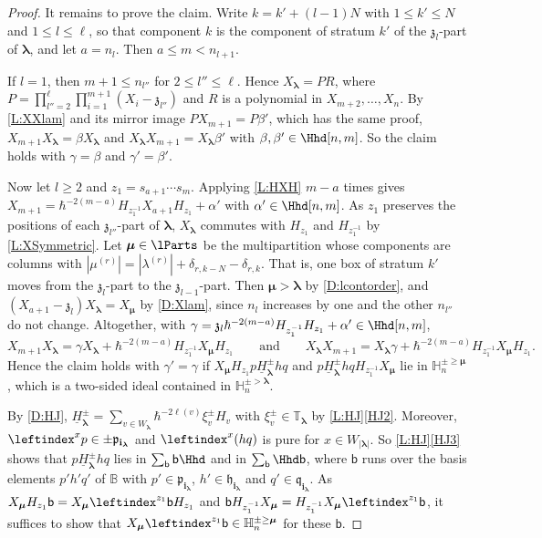 \documentclass[a4paper,11pt]{amsart}
\newcommand\blam{{\boldsymbol\lambda}}
\newcommand\bmu{{\boldsymbol\mu}}
\newcommand\bi{\mathbf{i}}
\newcommand\ilam[1][\blam]{\bi_{#1}}
\numberwithin{equation}{subsection}
\theoremstyle{definition}
\theoremstyle{theorem}
\theoremstyle{remark}
\newcommand\kapp{{\mathfrak{z}}}
\newcommand\plam[1][\lambda]{\mathfrak{p}_{#1}}
\newcommand\hlam[1][\lambda]{\mathfrak{h}_{#1}}
\newcommand\qlam[1][\lambda]{\mathfrak{q}_{#1}}
\newcommand\HH{\mathbb{H}}
\newcommand\HJpm{\underline{H}^\pm}
\newcommand\Sym{W}
\newcommand\xipm{\xi^\pm}
\newcommand\bb{\mathsf{b}}
\newcommand\Tos{\mathbb{T}}
\newcommand{\Bo}{\mathbb{B}}
\begin{document}
\begin{proof}
  It remains to prove the claim. Write $k=k'+(l-1)N$ with $1\le k'\le N$ and $1\le l\le\ell$, so that component $k$ is the component of stratum $k'$ of the $\kapp_l$-part of $\blam$, and let $a=n_l$. Then $a\le m<n_{l+1}$.

  If $l=1$, then $m+1\le n_{l''}$ for $2\le l''\le\ell$. Hence $X_\blam=PR$, where $P=\prod_{l''=2}^\ell\prod_{i=1}^{m+1}(X_i-\kapp_{l''})$ and $R$ is a polynomial in $X_{m+2},\dots,X_n$. By \autoref{L:XXlam} and its mirror image $PX_{m+1}=P\beta'$, which has the same proof, $X_{m+1}X_\blam=\beta X_\blam$ and $X_\blam X_{m+1}=X_\blam\beta'$ with $\beta,\beta'\in\Hhd[n,m]$. So the claim holds with $\gamma=\beta$ and $\gamma'=\beta'$.

  Now let $l\ge2$ and $z_1=s_{a+1}\cdots s_m$. Applying \autoref{L:HXH} $m-a$ times gives $X_{m+1}=\hbar^{-2(m-a)}H_{z_1^{-1}}X_{a+1}H_{z_1}+\alpha'$ with $\alpha'\in\Hhd[n,m]$. As $z_1$ preserves the positions of each $\kapp_{l''}$-part of $\blam$, $X_\blam$ commutes with $H_{z_1}$ and $H_{z_1^{-1}}$ by \autoref{L:XSymmetric}. Let $\bmu\in\lParts$ be the multipartition whose components are columns with $|\mu^{(r)}|=|\lambda^{(r)}|+\delta_{r,k-N}-\delta_{r,k}$. That is, one box of stratum $k'$ moves from the $\kapp_l$-part to the $\kapp_{l-1}$-part. Then $\bmu>\blam$ by \autoref{D:lcontorder}, and $(X_{a+1}-\kapp_l)X_\blam=X_\bmu$ by \autoref{D:Xlam}, since $n_l$ increases by one and the other $n_{l''}$ do not change. Altogether, with $\gamma=\kapp_l\hbar^{-2(m-a)}H_{z_1^{-1}}H_{z_1}+\alpha'\in\Hhd[n,m]$,
  \[
    X_{m+1}X_\blam=\gamma X_\blam+\hbar^{-2(m-a)}H_{z_1^{-1}}X_\bmu H_{z_1}
    \qquad\text{and}\qquad
    X_\blam X_{m+1}=X_\blam\gamma+\hbar^{-2(m-a)}H_{z_1^{-1}}X_\bmu H_{z_1}.
  \]
  Hence the claim holds with $\gamma'=\gamma$ if $X_\bmu H_{z_1}p\HJpm_\blam hq$ and $p\HJpm_\blam hqH_{z_1^{-1}}X_\bmu$ lie in $\HH^{\pm\ge\bmu}_n$, which is a two-sided ideal contained in $\HH^{\pm>\blam}_n$.

  By \autoref{D:HJ}, $\HJpm_\blam=\sum_{v\in\Sym_\blam}\hbar^{-2\ell(v)}\xipm_vH_v$ with $\xipm_v\in\Tos_\blam$ by \autoref{L:HJ}\autoref{HJ2}. Moreover, $\leftindex^xp\in\pm\plam[\ilam]$ and $\leftindex^x{(hq)}$ is pure for $x\in\Sym_{|\blam|}$. So \autoref{L:HJ}\autoref{HJ3} shows that $p\HJpm_\blam hq$ lies in $\sum_\bb\bb\Hhd$ and in $\sum_\bb\Hhd\bb$, where $\bb$ runs over the basis elements $p'h'q'$ of $\Bo$ with $p'\in\plam[\ilam]$, $h'\in\hlam[\ilam]$ and $q'\in\qlam[\ilam]$. As $X_\bmu H_{z_1}\bb=X_\bmu\leftindex^{z_1}\bb H_{z_1}$ and $\bb H_{z_1^{-1}}X_\bmu=H_{z_1^{-1}}X_\bmu\leftindex^{z_1}\bb$, it suffices to show that $X_\bmu\leftindex^{z_1}\bb\in\HH^{\pm\ge\bmu}_n$ for these $\bb$.


\end{proof}
\end{document}
